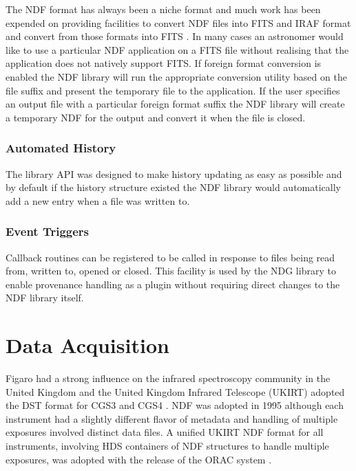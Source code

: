 \documentclass[final,authoryear,5p,times,twocolumn]{elsarticle}
\begin{document}
The NDF format has always been a niche format and much work has been
expended on providing facilities to convert NDF files into FITS and
IRAF format and convert from those formats into FITS \citep{SUN55}. In
many cases an astronomer would like to use a particular NDF
application on a FITS file without realising that the application does
not natively support FITS. If foreign format conversion is enabled the
NDF library will run the appropriate conversion utility based on the
file suffix and present the temporary file to the application. If the
user specifies an output file with a particular foreign format suffix
the NDF library will create a temporary NDF for the output and convert
it when the file is closed.

\subsubsection{Automated History}

The library API was designed to make history updating as easy
as possible and by default if the history structure existed the NDF
library would automatically add a new entry when a file was written
to.

\subsubsection{Event Triggers}

Callback routines can be registered to be called in response to files
being read from, written to, opened or closed. This facility is used
by the NDG library \citep{SUN2} to enable provenance handling
as a plugin without requiring direct changes to the NDF library itself.

\section{Data Acquisition}
\label{sec:daq}

Figaro had a strong influence on the infrared spectroscopy community
in the United Kingdom and the United Kingdom Infrared Telescope
(UKIRT) adopted the DST format for CGS3 and CGS4 \citep{1993SPIE.1946..547W}. NDF was adopted in
1995 although each instrument had a slightly different flavor of
metadata and handling of multiple exposures involved distinct data
files. A unified UKIRT NDF format for all instruments, involving HDS
containers of NDF structures to handle multiple exposures, was
adopted with the release of the ORAC system \citep{2000SPIE.4009..227B}.
\end{document}
